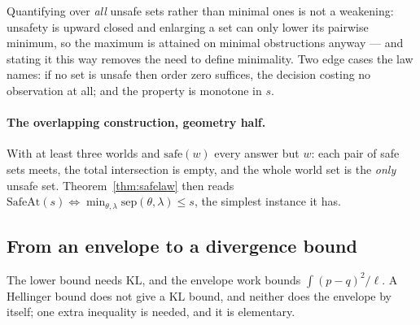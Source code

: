 Quantifying over \emph{all} unsafe sets rather than minimal ones is not a weakening:
unsafety is upward closed and enlarging a set can only lower its pairwise minimum, so the
maximum is attained on minimal obstructions anyway --- and stating it this way removes the
need to define minimality. Two edge cases the law names: if no set is unsafe then order zero
suffices, the decision costing no observation at all; and the property is monotone in $s$.

\paragraph{The overlapping construction, geometry half.}
With at least three worlds and $\mathrm{safe}(w)$ every answer but $w$: each pair of safe
sets meets, the total intersection is empty, and the whole world set is the \emph{only}
unsafe set. Theorem~\ref{thm:safelaw} then reads
$\mathrm{SafeAt}(s)\iff\min_{\theta,\lambda}\mathrm{sep}(\theta,\lambda)\le s$, the
simplest instance it has.



\subsection{From an envelope to a divergence bound}
\label{sec:envelope2kl}

The lower bound needs $\mathrm{KL}$, and the envelope work bounds
$\int(p-q)^{2}/\ell$. A Hellinger bound does not give a $\mathrm{KL}$ bound, and neither
does the envelope by itself; one extra inequality is needed, and it is elementary.


